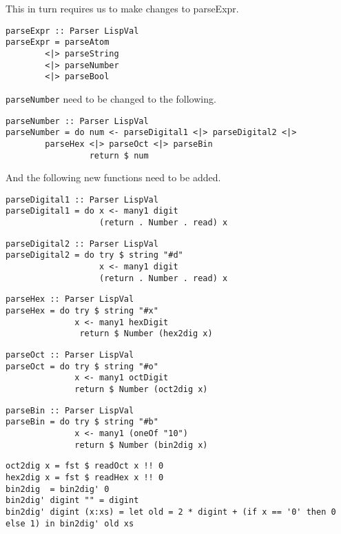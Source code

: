 This in turn requires us to make changes to parseExpr.
 
\begin{lstlisting}
parseExpr :: Parser LispVal
parseExpr = parseAtom
        <|> parseString
        <|> parseNumber
        <|> parseBool
\end{lstlisting}
 
\verb|parseNumber| need to be changed to the following.
 
\begin{lstlisting}
parseNumber :: Parser LispVal
parseNumber = do num <- parseDigital1 <|> parseDigital2 <|>
        parseHex <|> parseOct <|> parseBin
                 return $ num
\end{lstlisting}
 
And the following new functions need to be added.
 
 
\begin{lstlisting}
parseDigital1 :: Parser LispVal
parseDigital1 = do x <- many1 digit
                   (return . Number . read) x   
\end{lstlisting}
 
\begin{lstlisting}
parseDigital2 :: Parser LispVal
parseDigital2 = do try $ string "#d"
                   x <- many1 digit
                   (return . Number . read) x
\end{lstlisting}
 
\begin{lstlisting}
parseHex :: Parser LispVal
parseHex = do try $ string "#x"
              x <- many1 hexDigit
               return $ Number (hex2dig x)
\end{lstlisting}
 
\begin{lstlisting}
parseOct :: Parser LispVal
parseOct = do try $ string "#o"
              x <- many1 octDigit
              return $ Number (oct2dig x)
\end{lstlisting}
 
\begin{lstlisting}
parseBin :: Parser LispVal
parseBin = do try $ string "#b"
              x <- many1 (oneOf "10")
              return $ Number (bin2dig x)
\end{lstlisting}
 
\begin{lstlisting}
oct2dig x = fst $ readOct x !! 0
hex2dig x = fst $ readHex x !! 0
bin2dig  = bin2dig' 0
bin2dig' digint "" = digint
bin2dig' digint (x:xs) = let old = 2 * digint + (if x == '0' then 0 else 1) in bin2dig' old xs
\end{lstlisting}
 
